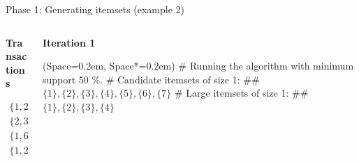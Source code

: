 \documentclass[12pt, aspectratio=1610]{beamer}
\newcommand{\listSpace}{0.2em}
\theoremstyle{plain}
\begin{document}
\begin{frame}[fragile]{Phase 1: Generating itemsets (example 2)}
\begin{Example}
\begin{columns}
	\begin{column}{0.25\textwidth}
		
		\begin{center}
			\textbf{Transactions}
		\end{center}
		\vspace{-1em}
		\begin{align*}
		\{ 1, 2, 7, 4 \} \\ 
		\{ 2, 3, 4 \} \\
		\{ 1, 6, 3 \} \\
		\{ 1, 2, 4, 5 \}
		\end{align*}
	\end{column}
	\begin{column}{0.75\textwidth}  %
		\begin{center}
			\textbf{Iteration 1}
		\end{center}
		\begin{easylist}[itemize]
			\ListProperties(Space=\listSpace, Space*=\listSpace)
			# Running the algorithm with minimum support 50 \%.
			# Candidate itemsets of size 1:
			## $\{1\}, \{2\}, \{3\}, \{4\}, \{5\}, \{6\}, \{7\}$
			# Large itemsets of size 1:
			## $\{1\}, \{2\}, \{3\}, \{4\}$
		\end{easylist}
	\end{column}
\end{columns}
\end{Example}
\end{frame}
\end{document}
